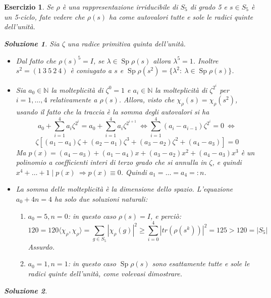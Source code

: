 \documentclass[a4paper]{article}
\theoremstyle{break}
\newtheorem{ex}{{ \Large Esercizio} }
\theoremstyle{plain}
\newtheorem{sol}{Soluzione}[ex]
\DeclareMathOperator{\Sp}{Sp}
\begin{document}
\begin{ex}
Se $\rho$ è una rappresentazione irriducibile di $S_5$ di grado 5 e $s \in S_5$ è un 5-ciclo, fate vedere che $\rho(s)$ ha come autovalori tutte e sole le radici quinte dell’unità.

\begin{sol}
	Sia $\zeta$ una radice primitiva quinta dell'unità.
	\begin{itemize}
		\item Dal fatto che $\rho(s)^5 = I$, se $\lambda \in \Sp \rho(s)$ allora $\lambda^5=1$. \newline
		Inoltre $s^2=(1\ 3 \ 5 \ 2\ 4)$ è coniugato a $s$ e $\Sp \rho(s^2) = \{\lambda^2:\ \lambda \in \Sp \rho(s) \}$.
		\item Sia $a_0 \in \mathbb{N} $ la molteplicità di $\zeta^0 = 1$ e $a_i \in \mathbb{N}$ la molteplicità di $\zeta^{2^i}$ per $i=1, \ldots,4$ relativamente a $\rho(s)$. Allora, visto che $\chi_{\rho}(s) = \chi_{\rho}(s^2)$, usando il fatto che la traccia è la somma degli autovalori si ha
		$$ a_0 + \sum_{i=1}^4 a_i \zeta^{2^i} = a_0 + \sum_{i=1}^4 a_i \zeta^{2^{i+1}}\  \Leftrightarrow \sum_{i=1}^4 (a_i - a_{i-1})\zeta^{2^i} = 0 \ \Leftrightarrow $$
		$$ \zeta [ (a_1-a_4)\zeta + (a_2-a_1)\zeta^3 + (a_3 - a_2) \zeta^2 + (a_4 - a_3) ] = 0 $$
		Ma $p(x) = (a_4-a_3) + (a_1-a_4)x + (a_3-a_2)x^2 + (a_4-a_3)x^3 $ è un polinomio a coefficienti interi di terzo grado che si annulla in $\zeta$, e quindi \newline
		$x^4+ \ldots + 1 \mid p(x) \ \Rightarrow p(x) \equiv 0$. \newline
		Quindi $a_1 = \ldots = a_4 =:n$.
		\item La somma delle molteplicità è la dimensione dello spazio. L'equazione $a_0+4n=4$ ha solo due soluzioni naturali:
			\begin{enumerate}
				\item $a_0=5, n=0$: in questo caso $\rho(s)=I$, e perciò: 
				$$ 120 = 120 \langle \chi_{\rho}, \chi_{\rho} \rangle = \sum_{g \in S_5} | \chi_{\rho}(g) |^2 \ge \sum_{i=0}^{4} |tr(\rho(s^k))|^2 = 125 > 120 = |S_5| $$
				Assurdo.
				\item $a_0 = 1, n=1$: in questo caso $\Sp \rho(s)$ sono esattamente tutte e sole le radici quinte dell'unità, come volevasi dimostrare.
			\end{enumerate}
	\end{itemize}
\end{sol}

\begin{sol}

\end{sol}


\end{ex}
\end{document}
